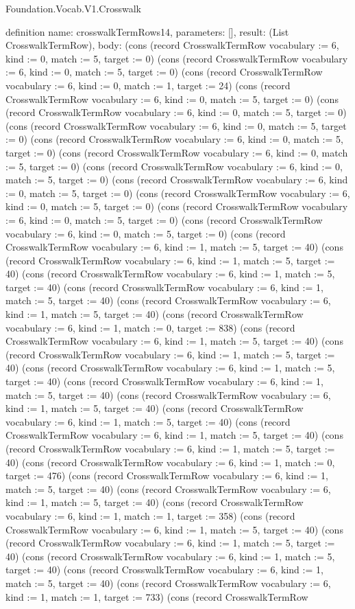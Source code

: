 \begin{lexlean}{Foundation.Vocab.V1.Crosswalk}
\begin{semanticmodule}
definition{
  name: crosswalkTermRows14,
  parameters: [],
  result: (List CrosswalkTermRow),
  body: (cons (record CrosswalkTermRow {vocabulary := 6, kind := 0, match := 5, target := 0}) (cons (record CrosswalkTermRow {vocabulary := 6, kind := 0, match := 5, target := 0}) (cons (record CrosswalkTermRow {vocabulary := 6, kind := 0, match := 1, target := 24}) (cons (record CrosswalkTermRow {vocabulary := 6, kind := 0, match := 5, target := 0}) (cons (record CrosswalkTermRow {vocabulary := 6, kind := 0, match := 5, target := 0}) (cons (record CrosswalkTermRow {vocabulary := 6, kind := 0, match := 5, target := 0}) (cons (record CrosswalkTermRow {vocabulary := 6, kind := 0, match := 5, target := 0}) (cons (record CrosswalkTermRow {vocabulary := 6, kind := 0, match := 5, target := 0}) (cons (record CrosswalkTermRow {vocabulary := 6, kind := 0, match := 5, target := 0}) (cons (record CrosswalkTermRow {vocabulary := 6, kind := 0, match := 5, target := 0}) (cons (record CrosswalkTermRow {vocabulary := 6, kind := 0, match := 5, target := 0}) (cons (record CrosswalkTermRow {vocabulary := 6, kind := 0, match := 5, target := 0}) (cons (record CrosswalkTermRow {vocabulary := 6, kind := 0, match := 5, target := 0}) (cons (record CrosswalkTermRow {vocabulary := 6, kind := 1, match := 5, target := 40}) (cons (record CrosswalkTermRow {vocabulary := 6, kind := 1, match := 5, target := 40}) (cons (record CrosswalkTermRow {vocabulary := 6, kind := 1, match := 5, target := 40}) (cons (record CrosswalkTermRow {vocabulary := 6, kind := 1, match := 5, target := 40}) (cons (record CrosswalkTermRow {vocabulary := 6, kind := 1, match := 5, target := 40}) (cons (record CrosswalkTermRow {vocabulary := 6, kind := 1, match := 0, target := 838}) (cons (record CrosswalkTermRow {vocabulary := 6, kind := 1, match := 5, target := 40}) (cons (record CrosswalkTermRow {vocabulary := 6, kind := 1, match := 5, target := 40}) (cons (record CrosswalkTermRow {vocabulary := 6, kind := 1, match := 5, target := 40}) (cons (record CrosswalkTermRow {vocabulary := 6, kind := 1, match := 5, target := 40}) (cons (record CrosswalkTermRow {vocabulary := 6, kind := 1, match := 5, target := 40}) (cons (record CrosswalkTermRow {vocabulary := 6, kind := 1, match := 5, target := 40}) (cons (record CrosswalkTermRow {vocabulary := 6, kind := 1, match := 5, target := 40}) (cons (record CrosswalkTermRow {vocabulary := 6, kind := 1, match := 5, target := 40}) (cons (record CrosswalkTermRow {vocabulary := 6, kind := 1, match := 0, target := 476}) (cons (record CrosswalkTermRow {vocabulary := 6, kind := 1, match := 5, target := 40}) (cons (record CrosswalkTermRow {vocabulary := 6, kind := 1, match := 5, target := 40}) (cons (record CrosswalkTermRow {vocabulary := 6, kind := 1, match := 1, target := 358}) (cons (record CrosswalkTermRow {vocabulary := 6, kind := 1, match := 5, target := 40}) (cons (record CrosswalkTermRow {vocabulary := 6, kind := 1, match := 5, target := 40}) (cons (record CrosswalkTermRow {vocabulary := 6, kind := 1, match := 5, target := 40}) (cons (record CrosswalkTermRow {vocabulary := 6, kind := 1, match := 5, target := 40}) (cons (record CrosswalkTermRow {vocabulary := 6, kind := 1, match := 1, target := 733}) (cons (record CrosswalkTermRow }
\end{semanticmodule}
\end{lexlean}
